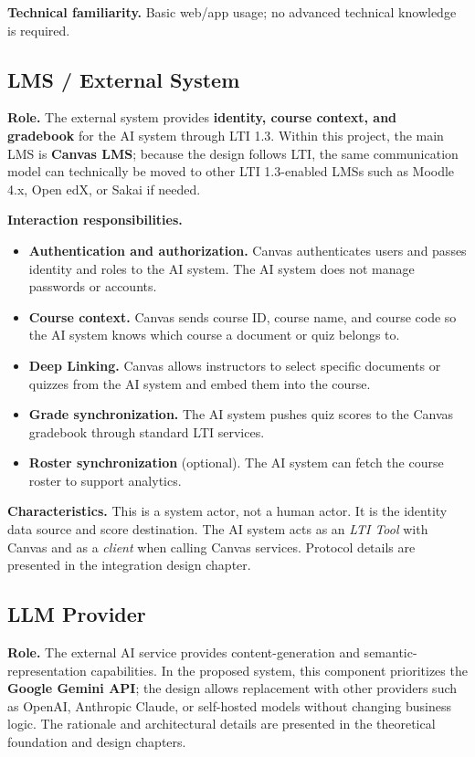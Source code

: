 \textbf{Technical familiarity.} Basic web/app usage; no advanced technical
knowledge is required.

\subsection{LMS / External System}

\textbf{Role.} The external system provides \textbf{identity, course context,
and gradebook} for the AI system through LTI 1.3. Within this project, the main
LMS is \textbf{Canvas LMS}; because the design follows LTI, the same
communication model can technically be moved to other LTI 1.3-enabled LMSs
such as Moodle 4.x, Open edX, or Sakai if needed.

\textbf{Interaction responsibilities.}

\begin{itemize}
    \item \textbf{Authentication and authorization.} Canvas authenticates users
          and passes identity and roles to the AI system. The AI system does
          not manage passwords or accounts.
    \item \textbf{Course context.} Canvas sends course ID, course name, and
          course code so the AI system knows which course a document or quiz
          belongs to.
    \item \textbf{Deep Linking.} Canvas allows instructors to select specific
          documents or quizzes from the AI system and embed them into the
          course.
    \item \textbf{Grade synchronization.} The AI system pushes quiz scores to
          the Canvas gradebook through standard LTI services.
    \item \textbf{Roster synchronization} (optional). The AI system can fetch
          the course roster to support analytics.
\end{itemize}

\textbf{Characteristics.} This is a system actor, not a human actor. It is the
identity data source and score destination. The AI system acts as an
\textit{LTI Tool} with Canvas and as a \textit{client} when calling Canvas
services. Protocol details are presented in the integration design chapter.

\subsection{LLM Provider}

\textbf{Role.} The external AI service provides content-generation and
semantic-representation capabilities. In the proposed system, this component
prioritizes the \textbf{Google Gemini API}; the design allows replacement with
other providers such as OpenAI, Anthropic Claude, or self-hosted models without
changing business logic. The rationale and architectural details are presented
in the theoretical foundation and design chapters.

